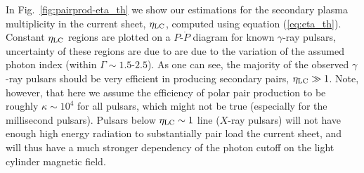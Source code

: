 \begin{figure}[htb]
\end{figure}

In Fig.~\ref{fig:pairprod-eta_th} we show our estimations for the secondary plasma multiplicity in the current sheet, $\eta_{\rm LC}$, computed using equation (\ref{eq:eta_th}). Constant $\eta_{\rm LC}$ regions are plotted on a $P$-$\dot{P}$ diagram for known $\gamma$-ray pulsars, uncertainty of these regions are due to are due to the variation of the assumed photon index (within $\Gamma\sim 1.5\text{-}2.5$). As one can see, the majority of the observed $\gamma$-ray pulsars should be very efficient in producing secondary pairs, $\eta_{\rm LC}\gg 1$. Note, however, that here we assume the efficiency of polar pair production to be roughly $\kappa\sim 10^4$ for all pulsars, which might not be true (especially for the millisecond pulsars). Pulsars below $\eta_{\rm LC}\sim 1$ line ($X$-ray pulsars) will not have enough high energy radiation to substantially pair load the current sheet, and will thus have a much stronger dependency of the photon cutoff on the light cylinder magnetic field.

